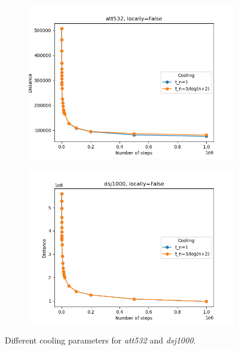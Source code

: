 \begin{figure}[!htb]
	\centering
	\begin{subfigure}{0.45\textwidth}
		\includegraphics[width=\textwidth]{img/att532_annealing_locally=False}
	\end{subfigure}
	\begin{subfigure}{0.45\textwidth}
		\includegraphics[width=\textwidth]{img/dsj1000_annealing_locally=False}
	\end{subfigure}
	\caption{Different cooling parameters for \textit{att532} and \textit{dsj1000}.}
	\label{fig:annealing_2}
\end{figure}
